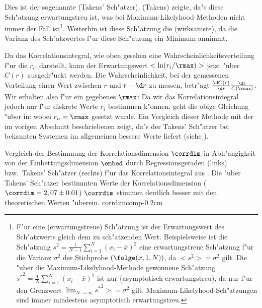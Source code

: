 Dies ist der sogenannte \begriff(Takens' Sch"atzer). \autor(Takens) zeigte, da"s
diese Sch"atzung erwartungstreu ist, was bei Maximum-Likelyhood-Methoden
nicht immer der Fall ist\footnote{F"ur eine \begriff(erwartungstreue) Sch"atzung ist
  der Erwartungswert des Sch"atzwerts gleich dem zu sch"atzenden Wert. Beispielsweise ist
  die Sch"atzung $s^2=\frac1{N-1}\sum_{i=1}^N(x_i-\bar x)^2$ eine erwartungstreue
  Sch"atzung f"ur die Varianz $\sigma^2$ der Stichprobe $(\folge(x,1,N))$, da
  $<s^2>=\sigma^2$ gilt. Die "uber die Maximum-Likelyhood-Methode gewonnene Sch"atzung
  ${s^*}^2=\frac1{N}\sum_{i=1}^N(x_i-\bar x)^2$ ist nur \begriff(asymptotisch
  erwartungstreu), da nur f"ur den Grenzwert $\lim_{N\to\infty}{s^*}^2> = \sigma^2$ gilt.
  Maximum-Likelyhood-Sch"atzungen sind immer mindestens asymptotisch erwartungstreu. }.
Weiterhin ist diese Sch"atzung die \begriff(wirksamste), da die Varianz des
Sch"atzwertes f"ur diese Sch"atzung ein Minimum annimmt. 

Da das Korrelationsintegral, wie oben gesehen eine Wahrscheinlichkeitsverteilung f"ur die
$r_i$, darstellt, kann der Erwartungswert $<\ln (r_i/\rmax)>$ jetzt "uber $C(r)$ ausgedr"uckt
werden. Die Wahrscheinlichkeit, bei der gemessenen Verteilung einen Wert zwischen $r$ und
$r+\d r$ zu messen, betr"agt $\frac{\d  C(r)}{\d r}\frac{\d r}{C(\rmax)}$. Wir erhalten
also f"ur ein gegebenes $\rmax$:
Da wir das Korrelationsintegral jedoch nur f"ur diskrete Werte $r_i$ bestimmen k"onnen,
geht die obige Gleichung "uber in:
wobei $r_n=\rmax$ gesetzt wurde.
Ein Vergleich dieser Methode mit der im vorigen Abschnitt beschriebenen zeigt, da"s der
Takens' Sch"atzer bei bekannten Systemen im allgemeinen bessere Werte liefert (siehe ).

 { Vergleich der
  Bestimmung der Korrelationsdimension $\corrdim$ in Abh"angigkeit von der
  Einbettungsdimension $\embed$ durch Regressionsgeraden (links) bzw.\ Takens' Sch"atzer
  (rechts) f"ur das Korrelationsintegral aus . Die "uber Takens'
  Sch"atzer bestimmten Werte der Korrelationsdimension ($\corrdim=2,07\pm0.01$) $\corrdim$
  stimmen deutlich besser mit den theoretischen Werten "uberein.  }  {corrdimcomp}{-0.2cm}

